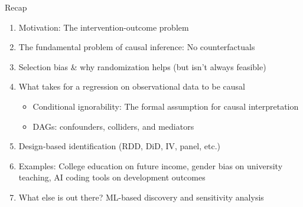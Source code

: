 \documentclass[aspectratio=169, 12pt]{beamer}
\begin{document}
\begin{frame}{Recap}
\begin{enumerate}\setlength\itemsep{0.4em}
  \item Motivation: The intervention-outcome problem
  \item The fundamental problem of causal inference: No counterfactuals
  \item Selection bias \& why randomization helps (but isn't always feasible)
  \item What takes for a regression on observational data to be causal
    \begin{itemize}
      \item Conditional ignorability: The formal assumption for causal interpretation
      \item DAGs: confounders, colliders, and mediators
    \end{itemize}
  \item Design-based identification (RDD, DiD, IV, panel, etc.)
  \item Examples: College education on future income, gender bias on university teaching, AI coding 
  tools on development outcomes
  \item What else is out there? ML-based discovery and sensitivity analysis
\end{enumerate}
\end{frame}
\end{document}
